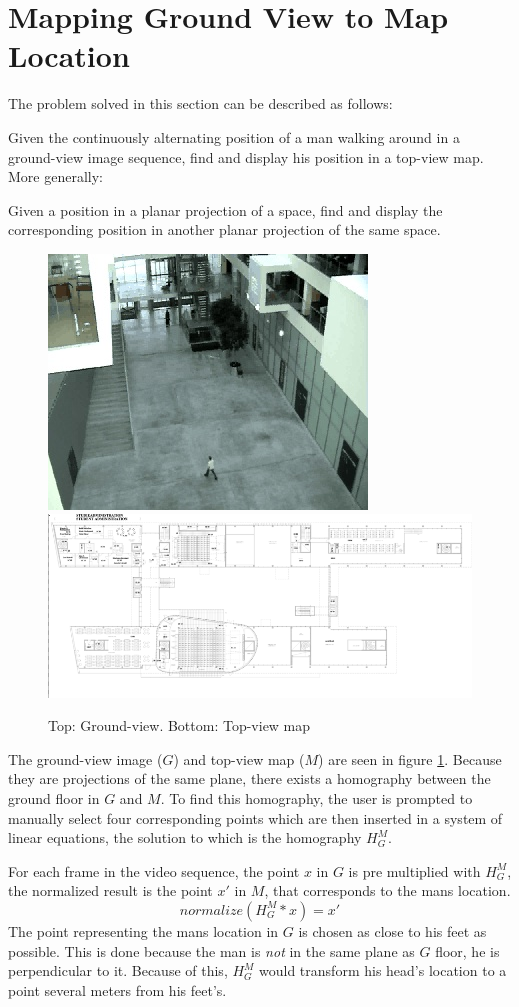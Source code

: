 \section{Mapping Ground View to Map Location}
The problem solved in this section can be described as follows:

Given the
continuously alternating position of a man walking around in a ground-view
image sequence, find and display his position in a top-view map.  More
generally:

Given a position in a planar projection of a space, find and display the
corresponding position in another planar projection of the same space.

\begin{figure}[h]
\includegraphics{./pics/Ground.jpg}
\includegraphics{./pics/ITUMap.png}
\caption{Top: Ground-view. Bottom: Top-view map}
\label{fig:groundvsmap}
\end{figure}

The ground-view image ($G$) and top-view map ($M$) are seen in figure
\ref{fig:groundvsmap}. Because they are projections of the same plane, there
exists a homography between the ground floor in $G$ and $M$. To find this
homography, the user is prompted to manually select four corresponding points
which are then inserted in a system of linear equations, the solution to which
is the homography $H_{G}^{M}$.

For each frame in the video sequence, the point $x$ in $G$ is pre multiplied
with $H_{G}^{M}$, the normalized result is the point $x'$ in $M$, that
corresponds to the mans location. $$normalize(H_{G}^{M}*x) = x'$$ The point
representing the mans location in $G$ is chosen as close to his feet as possible.
This is done because the man is \emph{not} in the same plane as $G$ floor, he
is perpendicular to it. Because of this, $H_{G}^{M}$ would transform
his head's location to a point several meters from his feet's.
